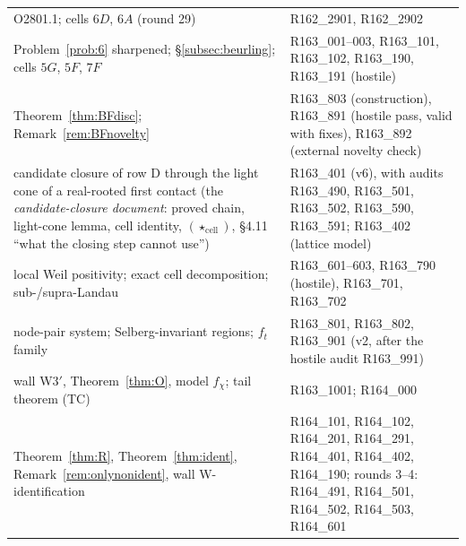 \documentclass[11pt]{amsart}
\theoremstyle{definition}
\theoremstyle{remark}
\begin{document}
\begin{center}
\begin{tabularx}{\textwidth}{@{}p{5.2cm}Y@{}}
O2801.1; cells $6D$, $6A$ (round 29) & R162\_2901, R162\_2902 \\
Problem~\ref{prob:6} sharpened; \S\ref{subsec:beurling}; cells $5G$, $5F$, $7F$ & R163\_001--003, R163\_101, R163\_102, R163\_190, R163\_191 (hostile) \\
Theorem~\ref{thm:BFdisc}; Remark~\ref{rem:BFnovelty} & R163\_803 (construction), R163\_891 (hostile pass, valid with fixes), R163\_892 (external novelty check) \\
candidate closure of row D through the light cone of a real-rooted first contact (the \emph{candidate-closure document}: proved chain, light-cone lemma, cell identity, $(\star_{\mathrm{cell}})$, \S4.11 ``what the closing step cannot use'') & R163\_401 (v6), with audits R163\_490, R163\_501, R163\_502, R163\_590, R163\_591; R163\_402 (lattice model) \\
local Weil positivity; exact cell decomposition; sub-/supra-Landau & R163\_601--603, R163\_790 (hostile), R163\_701, R163\_702 \\
node-pair system; Selberg-invariant regions; $f_t$ family & R163\_801, R163\_802, R163\_901 (v2, after the hostile audit R163\_991) \\
wall W3$'$, Theorem~\ref{thm:O}, model $f_\chi$; tail theorem (TC) & R163\_1001; R164\_000 \\
Theorem~\ref{thm:R}, Theorem~\ref{thm:ident}, Remark~\ref{rem:onlynonident}, wall W-identification & R164\_101, R164\_102, R164\_201, R164\_291, R164\_401, R164\_402, R164\_190; rounds 3--4: R164\_491, R164\_501, R164\_502, R164\_503, R164\_601 \\
\bottomrule
\end{tabularx}
\end{center}
\end{document}

